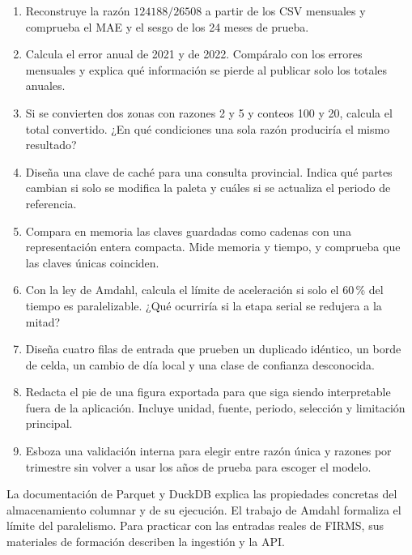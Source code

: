 \ejercicios
\begin{enumerate}
\item Reconstruye la razón $124188/26508$ a partir de los CSV mensuales y comprueba el
MAE y el sesgo de los 24 meses de prueba.
\item Calcula el error anual de 2021 y de 2022. Compáralo con los errores mensuales y
explica qué información se pierde al publicar solo los totales anuales.
\item Si se convierten dos zonas con razones 2 y 5 y conteos 100 y 20, calcula el total
convertido. ¿En qué condiciones una sola razón produciría el mismo resultado?
\item Diseña una clave de caché para una consulta provincial. Indica qué partes cambian
si solo se modifica la paleta y cuáles si se actualiza el periodo de referencia.
\item Compara en memoria las claves guardadas como cadenas con una representación
entera compacta. Mide memoria y tiempo, y comprueba que las claves únicas coinciden.
\item Con la ley de Amdahl, calcula el límite de aceleración si solo el 60\,{}\% del
tiempo es paralelizable. ¿Qué ocurriría si la etapa serial se redujera a la mitad?
\item Diseña cuatro filas de entrada que prueben un duplicado idéntico, un borde de
celda, un cambio de día local y una clase de confianza desconocida.
\item Redacta el pie de una figura exportada para que siga siendo interpretable fuera
de la aplicación. Incluye unidad, fuente, periodo, selección y limitación principal.
\item Esboza una validación interna para elegir entre razón única y razones por
trimestre sin volver a usar los años de prueba para escoger el modelo.
\end{enumerate}

\lecturas
La documentación de Parquet y DuckDB explica las propiedades concretas del almacenamiento
columnar y de su ejecución. El trabajo de Amdahl formaliza
el límite del paralelismo. Para practicar con las entradas reales de
FIRMS, sus materiales de formación describen la ingestión y la API.
